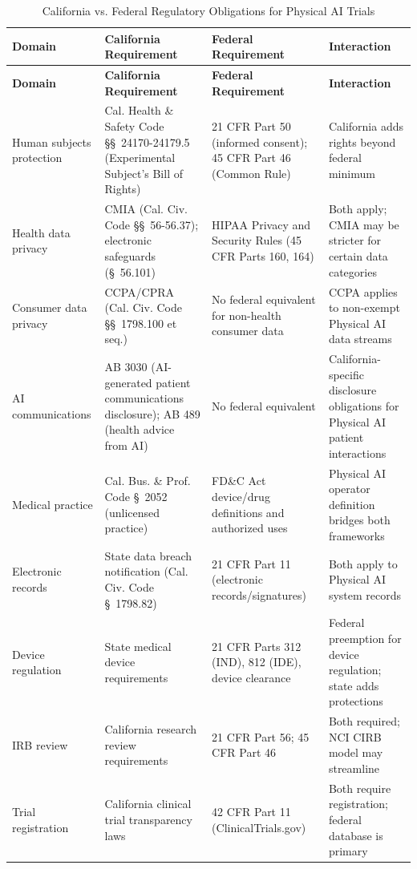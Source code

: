 \begin{longtable}{l p{4.5cm} p{4.5cm} p{3cm}}
\caption{California vs. Federal Regulatory Obligations for Physical AI Trials}
\label{tab:comparative-obligations} \\
\toprule
\textbf{Domain} & \textbf{California Requirement} & \textbf{Federal Requirement} & \textbf{Interaction} \\
\midrule
\endfirsthead
\toprule
\textbf{Domain} & \textbf{California Requirement} & \textbf{Federal Requirement} & \textbf{Interaction} \\
\midrule
\endhead
\bottomrule
\endfoot
Human subjects protection & Cal. Health \& Safety Code \S\S~24170-24179.5 (Experimental Subject's Bill of Rights) & 21 CFR Part 50 (informed consent); 45 CFR Part 46 (Common Rule) & California adds rights beyond federal minimum \\
Health data privacy & CMIA (Cal. Civ. Code \S\S~56-56.37); electronic safeguards (\S~56.101) & HIPAA Privacy and Security Rules (45 CFR Parts 160, 164) & Both apply; CMIA may be stricter for certain data categories \\
Consumer data privacy & CCPA/CPRA (Cal. Civ. Code \S\S~1798.100 et seq.) & No federal equivalent for non-health consumer data & CCPA applies to non-exempt Physical AI data streams \\
AI communications & AB 3030 (AI-generated patient communications disclosure); AB 489 (health advice from AI) & No federal equivalent & California-specific disclosure obligations for Physical AI patient interactions \\
Medical practice & Cal. Bus. \& Prof. Code \S~2052 (unlicensed practice) & FD\&C Act device/drug definitions and authorized uses & Physical AI operator definition bridges both frameworks \\
Electronic records & State data breach notification (Cal. Civ. Code \S~1798.82) & 21 CFR Part 11 (electronic records/signatures) & Both apply to Physical AI system records \\
Device regulation & State medical device requirements & 21 CFR Parts 312 (IND), 812 (IDE), device clearance & Federal preemption for device regulation; state adds protections \\
IRB review & California research review requirements & 21 CFR Part 56; 45 CFR Part 46 & Both required; NCI CIRB model may streamline \\
Trial registration & California clinical trial transparency laws & 42 CFR Part 11 (ClinicalTrials.gov) & Both require registration; federal database is primary \\
\end{longtable}

